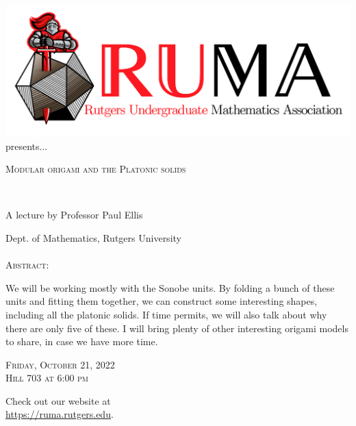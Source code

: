 \documentclass[12pt]{article}
\begin{document}

\begin{center}\includegraphics[scale=.3]{RUMAlogo.png}\\
\large  presents... \\

\vspace{2mm}
\begin{spacing}{2}
{\fontsize{42}{28}\selectfont  \textsc{
    Modular origami and the Platonic solids
    }} \end{spacing}
 
~~\\
\begin{spacing}{1}
{\fontsize{24}{24} \selectfont A lecture by Professor Paul Ellis}  \end{spacing} 
\large Dept. of Mathematics, Rutgers University \\~~\\

\normalsize
\textsc{Abstract:}

\Large 
We will be working mostly with the Sonobe units.  By folding a bunch of these units and fitting them together, we can construct some interesting shapes, including all the platonic solids.  If time permits, we will also talk about why there are only five of these.  I will bring plenty of other interesting origami models to share, in case we have more time.


\begin{spacing}{2}
    {\fontsize{36}{28}\selectfont  \textsc{
        Friday, October 21, 2022 \\Hill 703 at 6:00 pm
    }} 
\end{spacing}

\Large  Check out our website at \\
\url{https://ruma.rutgers.edu}.
\end{center}
\end{document}

